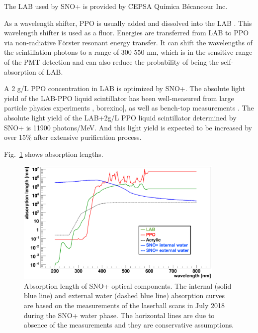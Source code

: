 The LAB used by SNO+ is provided by CEPSA Qu\'{i}mica B\'ecancour Inc.





As a wavelength shifter, PPO is usually added and dissolved into the LAB \cite{wunderly1990new}. This wavelength shifter is used as a fluor. Energies are transferred from LAB to PPO via non-radiative F{\"o}rster resonant energy transfer. It can shift the wavelengths of the scintillation photons to a range of 300-550 nm, which is in the sensitive range of the PMT detection and can also reduce the probability of being the self-absorption of LAB.

A 2 g/L PPO concentration in LAB is optimized by SNO+\cite{whitepaper}. The absolute light yield of the LAB-PPO liquid scintillator has been well-measured from large particle physics experiments \cite{xing2015preliminary}, borexino], as well as bench-top measurements \cite{xing2015preliminary,kaptanoglu2019cherenkov, novikov}. The absolute light yield of the LAB+2g/L PPO liquid scintillator determined by SNO+ is 11900 photons/MeV\cite{grullon2014light}. And this light yield is expected to be increased by over 15\% after extensive purification process\cite{snop_jinst}. 


Fig.~\ref{absLength} shows absorption lengths.

\begin{figure}[!htb]
	\centering
	\includegraphics[width=10cm]{absLength.png}
	\caption[Absorption length of SNO+ optical components.]{Absorption length of SNO+ optical components. The internal (solid blue line) and external water (dashed blue line) absorption curves are based on the measurements of the laserball scans in July 2018 during the SNO+ water phase. The horizontal lines are due to absence of the measurements and they are conservative assumptions.}
	\label{absLength}
\end{figure}

